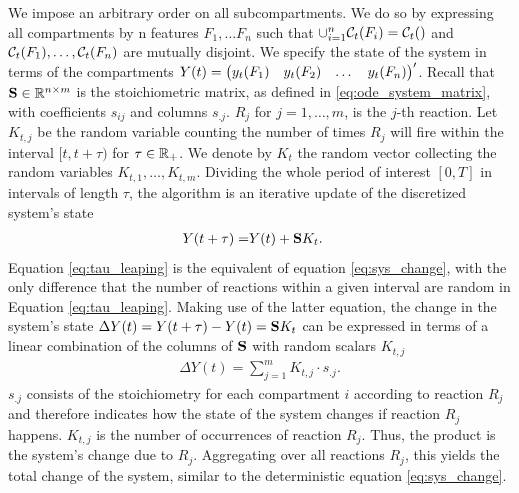 We impose an arbitrary order on all subcompartments. We do so by expressing all compartments by n features $F_1, \dots F_n$ such that $\cup_{i=1}^n \mathcal{C}_t(F_i) = \mathcal{C}_t()$ and $\mathcal{C}_t(F_1), \dots, \mathcal{C}_t(F_n)$ are mutually disjoint. We specify the state of the system in terms of the compartments $Y(t) = \begin{pmatrix} y_t(F_1) & y_t(F_2) & \dots & y_t(F_n)\end{pmatrix}'$. Recall that $\mathbf{S} \in \mathbb{R}^{n \times m}$ is the stoichiometric matrix, as defined in \eqref{eq:ode_system_matrix}, with coefficients $s_{ij}$ and columns $s_{.j}$. $R_j$ for $j=1, \dots, m$, is the $j$-th reaction. Let $K_{t,j}$ be the random variable counting the number of times $R_j$ will fire within the interval $[t, t + \tau)$ for $\tau \in \mathbb{R}_+$. We denote by $K_t$ the random vector collecting the random variables $K_{t,1}, \hdots, K_{t,m}$. Dividing the whole period of interest $[0, T]$ in intervals of length $\tau$, the algorithm is an iterative update of the discretized system's state
\begin{align}
\label{eq:tau_leaping}
Y(t + \tau) =& Y(t) + \mathbf{S} K_t.
\end{align}
Equation \eqref{eq:tau_leaping} is the equivalent of equation \eqref{eq:sys_change}, with the only difference that the number of reactions within a given interval are random in Equation \eqref{eq:tau_leaping}. Making use of the latter equation, the change in the system's state $\Delta Y(t) = Y(t + \tau) - Y(t)= \mathbf{S} K_t$ can be expressed in terms of a linear combination of the columns of $\mathbf{S}$ with random scalars $K_{t,j}$
\begin{align}
\Delta Y(t) = \sum_{j=1}^m K_{t,j} \cdot s_{.j}.
\end{align}
$s_{.j}$ consists of the stoichiometry for each compartment $i$ according to reaction $R_j$ and therefore indicates how the state of the system changes if reaction $R_j$ happens. $K_{t,j}$ is the number of occurrences of reaction $R_j$. Thus, the product is the system's change due to $R_j$. Aggregating over all reactions $R_j$, this yields the total change of the system, similar to the deterministic equation \eqref{eq:sys_change}.\\  

